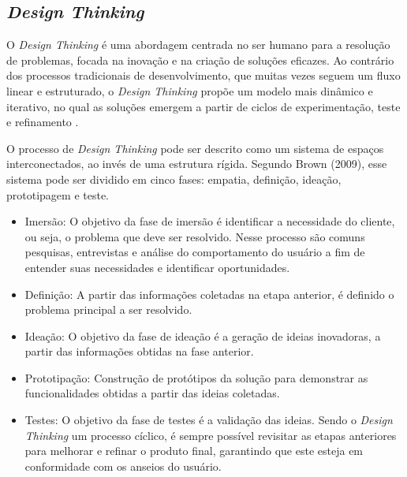 \subsection{\textit{Design Thinking}}
O \textit{Design Thinking} é uma abordagem centrada no ser humano para a resolução de problemas, focada na inovação e na criação de soluções eficazes. Ao contrário dos processos tradicionais de desenvolvimento, que muitas vezes seguem um fluxo linear e estruturado, o \textit{Design Thinking} propõe um modelo mais dinâmico e iterativo, no qual as soluções emergem a partir de ciclos de experimentação, teste e refinamento \cite{browndesignthinking}.

O processo de \textit{Design Thinking} pode ser descrito como um sistema de espaços interconectados, ao invés de uma estrutura rígida. Segundo Brown (2009), esse sistema pode ser dividido em cinco fases: empatia, definição, ideação, prototipagem e teste.

\begin{itemize}
    \item Imersão: O objetivo da fase de imersão é identificar a necessidade do cliente, ou seja, o problema que deve ser resolvido. Nesse processo são comuns pesquisas, entrevistas e análise do comportamento do usuário a fim de entender suas necessidades e identificar oportunidades.
    \item Definição: A partir das informações coletadas na etapa anterior, é definido o problema principal a ser resolvido.
    \item Ideação: O objetivo da fase de ideação é a geração de ideias inovadoras, a partir das informações obtidas na fase anterior. 
    \item Prototipação: Construção de protótipos da solução para demonstrar as funcionalidades obtidas a partir das ideias coletadas.
    \item Testes: O objetivo da fase de testes é a validação das ideias. Sendo o \textit{Design Thinking} um processo cíclico, é sempre possível revisitar as etapas anteriores para melhorar e refinar o produto final, garantindo que este esteja em conformidade com os anseios do usuário.
\end{itemize}


 